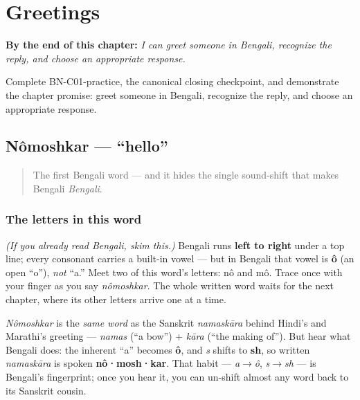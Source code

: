 
\chapter{Greetings}
\label{ch:greetings}

\begin{chapteropening}
\textbf{By the end of this chapter:} \emph{I can greet someone in Bengali, recognize the reply, and choose an appropriate response.}

Complete BN-C01-practice, the canonical closing checkpoint, and demonstrate the chapter promise: greet someone in Bengali, recognize the reply, and choose an appropriate response.
\end{chapteropening}

\section[\texorpdfstring{\bn{নমস্কার} (nômoshkar)}{নমস্কার (nômoshkar)}]{Nômoshkar — \textquotedblleft{}hello\textquotedblright{}}

\label{lesson:BN-C01-nomoshkar}



\begin{quote}
The first Bengali word — and it hides the single sound-shift that makes Bengali \emph{Bengali}.
\end{quote}

\subsection*{The letters in this word}
\emph{(If you already read Bengali, skim this.)} Bengali runs \textbf{left to right} under a top line; every consonant carries a built-in vowel — but in Bengali that vowel is \textbf{ô} (an open \textquotedblleft{}o\textquotedblright{}), \emph{not} \textquotedblleft{}a.\textquotedblright{} Meet two of this word's letters: \textbf{} nô and \textbf{} mô. Trace \textbf{} once with your finger as you say \emph{nômoshkar}. The whole written word waits for the next chapter, where its other letters arrive one at a time.

\begin{cousinweb}
\emph{Nômoshkar} is the \emph{same word} as the Sanskrit \emph{namaskāra} behind Hindi's and Marathi's greeting — \emph{namas} (\textquotedblleft{}a bow\textquotedblright{}) + \emph{kāra} (\textquotedblleft{}the making of\textquotedblright{}). But hear what Bengali does: the inherent \textquotedblleft{}a\textquotedblright{} becomes \textbf{ô}, and \emph{s} shifts to \textbf{sh}, so written \emph{namaskāra} is spoken \textbf{nô·mosh·kar}. That habit — \emph{a$\to$ô}, \emph{s$\to$sh} — is Bengali's fingerprint; once you hear it, you can un-shift almost any word back to its Sanskrit cousin.
\end{cousinweb}

